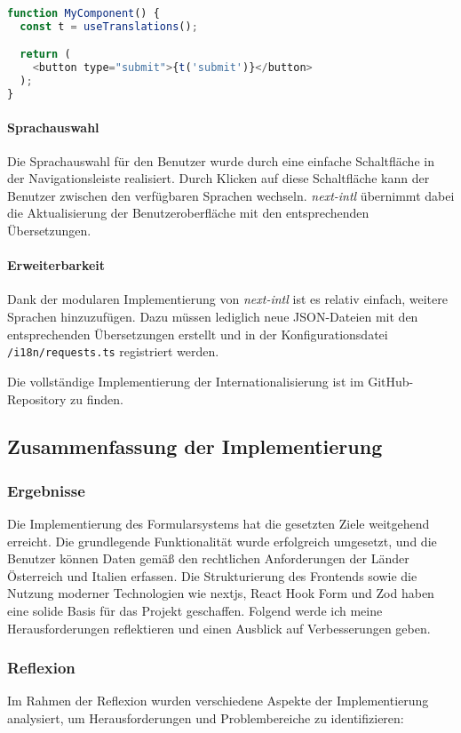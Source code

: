\begin{lstlisting}[language=JavaScript]
function MyComponent() {
  const t = useTranslations();

  return (
    <button type="submit">{t('submit')}</button>
  );
}
\end{lstlisting}

\paragraph{Sprachauswahl}
Die Sprachauswahl für den Benutzer wurde durch eine einfache Schaltfläche in der Navigationsleiste realisiert. Durch Klicken auf diese Schaltfläche kann der Benutzer zwischen den verfügbaren Sprachen wechseln. \textit{next-intl} übernimmt dabei die Aktualisierung der Benutzeroberfläche mit den entsprechenden Übersetzungen.

\paragraph{Erweiterbarkeit}
Dank der modularen Implementierung von \textit{next-intl} ist es relativ einfach, weitere Sprachen hinzuzufügen. Dazu müssen lediglich neue JSON-Dateien mit den entsprechenden Übersetzungen erstellt und in der Konfigurationsdatei \texttt{/i18n/requests.ts} registriert werden.

Die vollständige Implementierung der Internationalisierung ist im GitHub-Repository \cite{equilibriaSharingFrontend} zu finden.

\subsection{Zusammenfassung der Implementierung}
    
    \subsubsection{Ergebnisse}
    Die Implementierung des Formularsystems hat die gesetzten Ziele weitgehend erreicht. Die grundlegende Funktionalität wurde erfolgreich umgesetzt, und die Benutzer können Daten gemäß den rechtlichen Anforderungen der Länder Österreich und Italien erfassen.
    Die Strukturierung des Frontends sowie die Nutzung moderner Technologien wie \gls{nextjs}, React Hook Form und Zod haben eine solide Basis für das Projekt geschaffen. Folgend werde ich meine Herausforderungen reflektieren und einen Ausblick auf Verbesserungen geben.
    
    \subsubsection{Reflexion}
    Im Rahmen der Reflexion wurden verschiedene Aspekte der Implementierung analysiert, um Herausforderungen und Problembereiche zu identifizieren:
    
